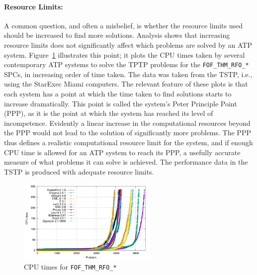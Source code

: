 \documentclass{easychair}
\begin{document}
\paragraph{Resource Limits:}
A common question, and often a misbelief, is whether the resource limits used should be increased
to find more solutions.
Analysis shows that increasing resource limits does not significantly affect which problems 
are solved by an ATP system. 
Figure~\ref{PPPPlot} illustrates this point; it plots the CPU times taken by several contemporary 
ATP systems to solve the TPTP problems for the {\tt FOF\_THM\_RFO\_*} SPCs, in increasing order 
of time taken. 
The data was taken from the TSTP, i.e., using the StarExec Miami computers.
The relevant feature of these plots is that each system has a point at which the time taken to 
find solutions starts to increase dramatically. 
This point is called the system's Peter Principle \cite{PH69} Point (PPP), as it is the point at 
which the system has reached its level of incompetence. 
Evidently a linear increase in the computational resources beyond the PPP would not lead to the 
solution of significantly more problems. 
The PPP thus defines a realistic computational resource limit for the system, and if enough CPU 
time is allowed for an ATP system to reach its PPP, a usefully accurate measure of what problems 
it can solve is achieved.
The performance data in the TSTP is produced with adequate resource limits.

\begin{figure}[htb]
\centering
\includegraphics[width=0.6\textwidth]{FOF_THM_RFO_PPP.pdf}
\vspace*{-1em}
\caption{CPU times for {\tt FOF\_THM\_RFO\_*}}
\label{PPPPlot}
\end{figure}
\end{document}
